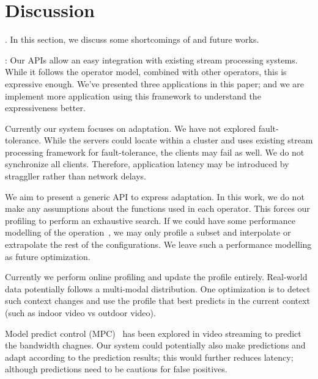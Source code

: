 \section{Discussion}
\label{sec:discussion}

. In this section, we discuss some shortcomings of
\sysname{} and future works.

: Our \maybe{} APIs allow an easy integration with existing
stream processing systems. While it follows the operator model, combined with
other operators, this is expressive enough. We've presented three applications
in this paper; and we are implement more application using this framework to
understand the expressiveness better.

 Currently our system focuses on
adaptation. We have not explored fault-tolerance. While the servers could locate
within a cluster and uses existing stream processing framework for
fault-tolerance, the clients may fail as well. We do not synchronize all
clients. Therefore, application latency may be introduced by straggller rather
than network delays.

 We aim to present a generic API to express
adaptation. In this work, we do not make any assumptions about the functions
used in each operator. This forces our profiling to perform an exhaustive
search. If we could have some performance modelling of the
operation~\cite{venkataraman2016ernest}, we may only profile a subset and
interpolate or extrapolate the rest of the configurations. We leave such a
performance modelling as future optimization.

 Currently we perform online profiling and update the
profile entirely. Real-world data potentially follows a multi-modal
distribution. One optimization is to detect such context changes and use the
profile that best predicts in the current context (such as indoor video vs
outdoor video).

 Model predict control
(MPC)~\cite{yin2015control} has been explored in video streaming to predict the
bandwidth chagnes. Our system could potentially also make predictions and adapt
according to the prediction results; this would further reduces latency;
although predictions need to be cautious for false positives.

